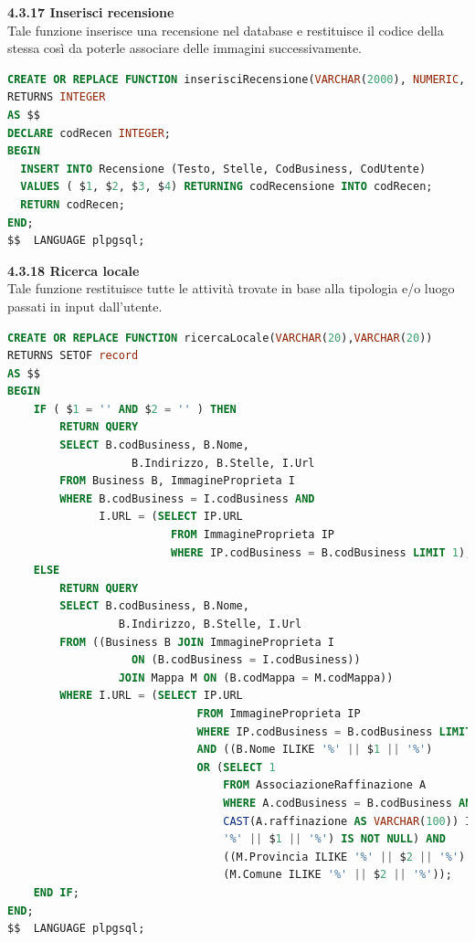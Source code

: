 \documentclass[a4paper,12pt]{article}
\begin{document}
\newpage\null{}\setcounter{page}{25}
\vspace{-2cm}
{\flushleft \bf 4.3.17  Inserisci recensione}\\
Tale funzione inserisce una recensione nel database e restituisce il codice della stessa
così da poterle associare delle immagini successivamente.
\begin{lstlisting}[language=SQL]
CREATE OR REPLACE FUNCTION inserisciRecensione(VARCHAR(2000), NUMERIC, INTEGER, INTEGER)
RETURNS INTEGER
AS $$
DECLARE codRecen INTEGER;
BEGIN
  INSERT INTO Recensione (Testo, Stelle, CodBusiness, CodUtente)
  VALUES ( $1, $2, $3, $4) RETURNING codRecensione INTO codRecen;
  RETURN codRecen;
END;
$$  LANGUAGE plpgsql;
\end{lstlisting}

\vspace*{+1cm}

{\flushleft \bf 4.3.18  Ricerca locale}\\
Tale funzione restituisce tutte le attività trovate in base alla tipologia e/o luogo passati in input dall'utente.
\begin{lstlisting}[language=SQL]
CREATE OR REPLACE FUNCTION ricercaLocale(VARCHAR(20),VARCHAR(20))
RETURNS SETOF record
AS $$
BEGIN
	IF ( $1 = '' AND $2 = '' ) THEN
		RETURN QUERY
		SELECT B.codBusiness, B.Nome, 
				   B.Indirizzo, B.Stelle, I.Url
		FROM Business B, ImmagineProprieta I
		WHERE B.codBusiness = I.codBusiness AND 
			  I.URL = (SELECT IP.URL 
			  		     FROM ImmagineProprieta IP 
			  		     WHERE IP.codBusiness = B.codBusiness LIMIT 1);
	ELSE
		RETURN QUERY
		SELECT B.codBusiness, B.Nome, 
			     B.Indirizzo, B.Stelle, I.Url
		FROM ((Business B JOIN ImmagineProprieta I 
				   ON (B.codBusiness = I.codBusiness)) 
			     JOIN Mappa M ON (B.codMappa = M.codMappa))
		WHERE I.URL = (SELECT IP.URL 
					         FROM ImmagineProprieta IP
					         WHERE IP.codBusiness = B.codBusiness LIMIT 1) 
					         AND ((B.Nome ILIKE '%' || $1 || '%') 
					         OR (SELECT 1
					       	     FROM AssociazioneRaffinazione A
					             WHERE A.codBusiness = B.codBusiness AND 
					             CAST(A.raffinazione AS VARCHAR(100)) ILIKE 
					             '%' || $1 || '%') IS NOT NULL) AND
		                         ((M.Provincia ILIKE '%' || $2 || '%') OR 
		                         (M.Comune ILIKE '%' || $2 || '%'));
	END IF;
END;
$$  LANGUAGE plpgsql;
\end{lstlisting}
\newpage
\end{document}
